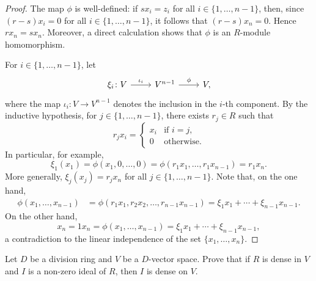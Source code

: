 \begin{proof}
    The map $\phi$ is well-defined: if $sx_i=z_i$ for all $i\in\{1,\dots,n-1\}$, then, since 
    $(r-s)x_i=0$ for all $i\in\{1,\dots,n-1\}$, it follows that
    $(r-s)x_n=0$. Hence $rx_n=sx_n$. Moreover, a direct calculation shows
    that $\phi$ is an $R$-module homomorphism. 

    For $i\in\{1,\dots,n-1\}$, let 
\[\begin{tikzcd}
	\xi_i\colon V & {V^{n-1}} & V,
	\arrow["{\iota_i}", from=1-1, to=1-2]
	\arrow["\phi", from=1-2, to=1-3]
\end{tikzcd}\]
    where the map $\iota_i\colon V\to V^{n-1}$ denotes the inclusion in the $i$-th component. By the inductive hypothesis, 
    for $j\in\{1,\dots,n-1\}$, there exists $r_j\in R$ such that 
    \[
    r_jx_i=\begin{cases}
        x_i & \text{if $i=j$,}\\
        0 & \text{otherwise.}
        \end{cases}
    \]
    In particular, for example, 
    \[
    \xi_1(x_1)=\phi(x_1,0,\dots,0)=\phi(r_1x_1,\dots,r_1x_{n-1})=r_1x_n.
    \]
    More generally, $\xi_j(x_j)=r_jx_n$ for all $j\in\{1,\dots,n-1\}$. Note that, on the one hand, 
    \begin{align*}
        \phi(x_1,\dots,x_{n-1}) &= \phi(r_1x_1,r_2x_2,\dots,r_{n-1}x_{n-1})
        =\xi_1x_1+\cdots+\xi_{n-1}x_{n-1}.
    \end{align*}
    On the other hand, 
    \[
    x_n=1x_n=\phi(x_1,\dots,x_{n-1})=\xi_1x_1+\cdots+\xi_{n-1}x_{n-1},
    \]
    a contradiction to the linear independence of the set $\{x_1,\dots,x_{n}\}$. 
\end{proof}

\begin{exercise}
	\label{xca:ideal_denso}
 Let $D$ be a division ring and $V$ be a $D$-vector space. Prove that 
	if $R$ is dense in $V$ and $I$ is a non-zero ideal of $R$, then 
	$I$ is dense on $V$. 
\end{exercise}



